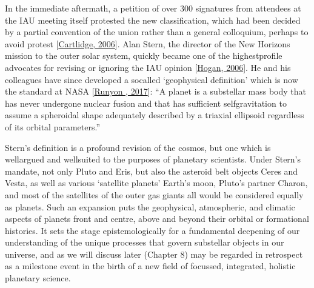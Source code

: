 \documentclass[letterpaper,10pt,english]{jupyterBook}
\begin{document}
\sphinxAtStartPar
In the immediate aftermath, a petition of over 300 signatures from attendees at the IAU meeting itself protested the new classification, which had been decided by a partial convention of the union rather than a general colloquium, perhaps to avoid protest {[}\hyperlink{cite.references:id633}{Cartlidge, 2006}{]}. Alan Stern, the director of the New Horizons mission to the outer solar system, quickly became one of the highest\sphinxhyphen{}profile advocates for revising or ignoring the IAU opinion {[}\hyperlink{cite.references:id628}{Hogan, 2006}{]}. He and his colleagues have since developed a so\sphinxhyphen{}called ‘geophysical definition’ which is now the standard at NASA {[}\hyperlink{cite.references:id639}{Runyon , 2017}{]}: “A planet is a sub\sphinxhyphen{}stellar mass body that has never undergone nuclear fusion and that has sufficient self\sphinxhyphen{}gravitation to assume a spheroidal shape adequately described by a triaxial ellipsoid regardless of its orbital parameters.”

\sphinxAtStartPar
Stern’s definition is a profound revision of the cosmos, but one which is well\sphinxhyphen{}argued and well\sphinxhyphen{}suited to the purposes of planetary scientists. Under Stern’s mandate, not only Pluto and Eris, but also the asteroid belt objects Ceres and Vesta, as well as various ‘satellite planets’ \sphinxhyphen{} Earth’s moon, Pluto’s partner Charon, and most of the satellites of the outer gas giants \sphinxhyphen{} all would be considered equally as planets. Such an expansion puts the geophysical, atmospheric, and climatic aspects of planets front and centre, above and beyond their orbital or formational histories. It sets the stage epistemologically for a fundamental deepening of our understanding of the unique processes that govern sub\sphinxhyphen{}stellar objects in our universe, and \sphinxhyphen{} as we will discuss later (Chapter 8) \sphinxhyphen{} may be regarded in retrospect as a milestone event in the birth of a new field of focussed, integrated, holistic planetary science.
\end{document}
